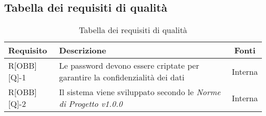 \subsection{Tabella dei requisiti di qualità}

\begin{center}
	\begin{table}[h]
	\begin{tabular}{|l|p{}|c|}
		\toprule
		
		\textbf{Requisito} & \textbf{Descrizione} & \textbf{Fonti} \\
		
		\midrule
		R[OBB][Q]-1	& Le password devono essere criptate per garantire la confidenzialità dei dati & Interna \\ \midrule
		R[OBB][Q]-2 & Il sistema viene sviluppato secondo le \textit{Norme di Progetto v1.0.0} & Interna \\
		
		\bottomrule

	\end{tabular}
	\caption{Tabella dei requisiti di qualità}
	
	\end{table}
\end{center}
\newpage


